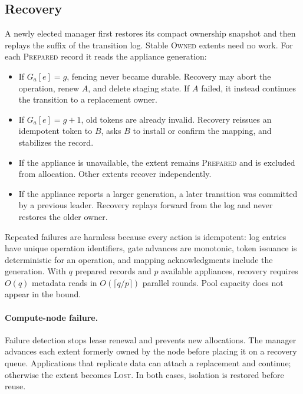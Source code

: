 \subsection{Recovery}
\label{sec:recovery}

A newly elected manager first restores its compact ownership snapshot and then
replays the suffix of the transition log. Stable \textsc{Owned} extents need no
work. For each \textsc{Prepared} record it reads the appliance generation:

\begin{itemize}[leftmargin=1.25em]
  \item If $G_a[e]=g$, fencing never became durable. Recovery may abort the
  operation, renew $A$, and delete staging state. If $A$ failed, it instead
  continues the transition to a replacement owner.
  \item If $G_a[e]=g+1$, old tokens are already invalid. Recovery reissues an
  idempotent token to $B$, asks $B$ to install or confirm the mapping, and
  stabilizes the record.
  \item If the appliance is unavailable, the extent remains \textsc{Prepared}
  and is excluded from allocation. Other extents recover independently.
  \item If the appliance reports a larger generation, a later transition was
  committed by a previous leader. Recovery replays forward from the log and
  never restores the older owner.
\end{itemize}

Repeated failures are harmless because every action is idempotent: log entries
have unique operation identifiers, gate advances are monotonic, token issuance
is deterministic for an operation, and mapping acknowledgments include the
generation. With $q$ prepared records and $p$ available appliances, recovery
requires $O(q)$ metadata reads in $O(\lceil q/p\rceil)$ parallel rounds. Pool
capacity does not appear in the bound.

\paragraph{Compute-node failure.}
Failure detection stops lease renewal and prevents new allocations. The manager
advances each extent formerly owned by the node before placing it on a recovery
queue. Applications that replicate data can attach a replacement and continue;
otherwise the extent becomes \textsc{Lost}. In both cases, isolation is restored
before reuse.

